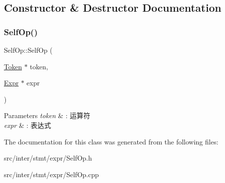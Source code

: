 \subsection{Constructor \& Destructor Documentation}
\mbox{\label{class_self_op_a5292e81fca1817185db15b29564a32ee}} 
\subsubsection{\texorpdfstring{Self\+Op()}{SelfOp()}}
{\footnotesize\ttfamily Self\+Op\+::\+Self\+Op (\begin{DoxyParamCaption}\item[{\hyperlink{class_token}{Token} $\ast$}]{token,  }\item[{\hyperlink{class_expr}{Expr} $\ast$}]{expr }\end{DoxyParamCaption})}


\begin{DoxyParams}{Parameters}
{\em token} & \+: 运算符 \\
\hline
{\em expr} & \+: 表达式 \\
\hline
\end{DoxyParams}


The documentation for this class was generated from the following files\+:\begin{DoxyCompactItemize}
\item 
src/inter/stmt/expr/Self\+Op.\+h\item 
src/inter/stmt/expr/Self\+Op.\+cpp\end{DoxyCompactItemize}
